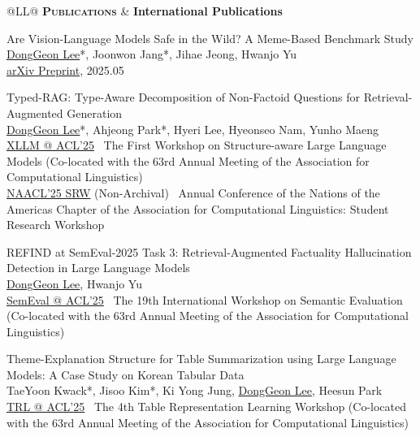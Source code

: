 \documentclass[11pt,a4paper]{article}
\newlength{\leftcolumn}
\newlength{\rightcolumn}
\newlength{\midrightcolumn}
\newcounter{pubnum}
\newenvironment{publications}
{\begin{list}{}
    {\setlength{\leftmargin}{1.35in}
     \setlength{\itemsep}{0.5em}
     \setlength{\labelsep}{0em}
     \renewcommand{\makelabel}[1]{##1}}}
{\end{list}}
\newcommand{\pubitem}[1]{%
    \addtocounter{pubnum}{-1}%
    \item[\textup{[\arabic{pubnum}]}] #1%
}
\begin{document}
\vspace{1em}

\begin{tabular}{@{}L{\leftcolumn}L{\midrightcolumn}@{}}
\textcolor{sectioncolor}{\textsc{\textbf{Publications}}} & \textbf{International Publications}
\end{tabular}
\vspace{-0.5em}

\begin{publications}


\pubitem{
    Are Vision-Language Models Safe in the Wild? A Meme-Based Benchmark Study\\
        \underline{DongGeon Lee}*, Joonwon Jang*, Jihae Jeong,  Hwanjo Yu \\[3pt]
        \href{https://arxiv.org/abs/2505.15389v1}{arXiv Preprint}, 2025.05
}

\pubitem{
    Typed-RAG: Type-Aware Decomposition of Non-Factoid Questions for Retrieval-Augmented Generation \\
        \underline{DongGeon Lee}*, Ahjeong Park*, Hyeri Lee, Hyeonseo Nam, Yunho Maeng \\[3pt]
        \href{https://aclanthology.org/2025.xllm-1.14/}{XLLM @ ACL'25} \textbar\ The First Workshop on Structure-aware Large Language Models (Co-located with the 63rd Annual Meeting of the Association for Computational Linguistics) \\[1.5pt]
        \href{https://arxiv.org/abs/2503.15879}{NAACL'25 SRW} (Non-Archival) \textbar\ Annual Conference of the Nations of the Americas Chapter of the Association for Computational Linguistics: Student Research Workshop
        
}


\pubitem{
    REFIND at SemEval-2025 Task 3: Retrieval-Augmented Factuality Hallucination Detection in Large Language Models\\
        \underline{DongGeon Lee}, Hwanjo Yu \\[3pt]
        \href{https://arxiv.org/abs/2502.13622}{SemEval @ ACL'25} \textbar\ The 19th International Workshop on Semantic Evaluation (Co-located with the 63rd Annual Meeting of the Association for Computational Linguistics)
}

\pubitem{
    Theme-Explanation Structure for Table Summarization using Large Language Models: A Case Study on Korean Tabular Data \\
        TaeYoon Kwack*, Jisoo Kim*, Ki Yong Jung, \underline{DongGeon Lee}, Heesun Park  \\[3pt]
        \href{https://aclanthology.org/2025.trl-1.1/}{TRL @ ACL'25} \textbar\ The 4th Table Representation Learning Workshop (Co-located with the 63rd Annual Meeting of the Association for Computational Linguistics)
}


\end{publications}
\end{document}
